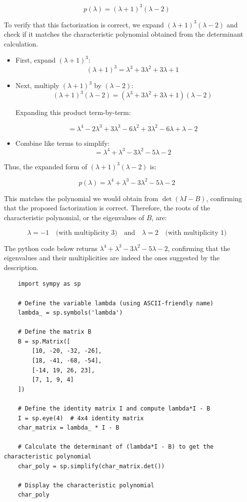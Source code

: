 \documentclass{article}
\begin{document}
\[
    p(\lambda) = (\lambda + 1)^3 (\lambda - 2)
\]

To verify that this factorization is correct, we expand \( (\lambda + 1)^3 (\lambda - 2) \) and check if it matches the characteristic polynomial obtained from the determinant calculation.

\begin{itemize}
    \item First, expand \( (\lambda + 1)^3 \):
          \[
              (\lambda + 1)^3 = \lambda^3 + 3\lambda^2 + 3\lambda + 1
          \]

    \item Next, multiply \( (\lambda + 1)^3 \) by \( (\lambda - 2) \):
          \[
              (\lambda + 1)^3 (\lambda - 2) = (\lambda^3 + 3\lambda^2 + 3\lambda + 1)(\lambda - 2)
          \]

          Expanding this product term-by-term:

          \[
              = \lambda^4 - 2\lambda^3 + 3\lambda^3 - 6\lambda^2 + 3\lambda^2 - 6\lambda + \lambda - 2
          \]

    \item Combine like terms to simplify:
          \[
              = \lambda^4 + \lambda^3 - 3\lambda^2 - 5\lambda - 2
          \]
\end{itemize}

Thus, the expanded form of \( (\lambda + 1)^3 (\lambda - 2) \) is:

\[
    p(\lambda) = \lambda^4 + \lambda^3 - 3\lambda^2 - 5\lambda - 2
\]

This matches the polynomial we would obtain from \( \det(\lambda I - B) \), confirming that the proposed factorization is correct. Therefore, the roots of the characteristic polynomial, or the eigenvalues of \( B \), are:

\[
    \lambda = -1 \quad \text{(with multiplicity 3)} \quad \text{and} \quad \lambda = 2 \quad \text{(with multiplicity 1)}
\]

The python code below returns $\displaystyle \lambda^{4} + \lambda^{3} - 3 \lambda^{2} - 5 \lambda - 2$,
confirming that the eigenvalues and their multiplicities are indeed the ones suggested by the description.
\begin{lstlisting}
    import sympy as sp

    # Define the variable lambda (using ASCII-friendly name)
    lambda_ = sp.symbols('lambda')

    # Define the matrix B
    B = sp.Matrix([
        [10, -20, -32, -26],
        [18, -41, -68, -54],
        [-14, 19, 26, 23],
        [7, 1, 9, 4]
    ])

    # Define the identity matrix I and compute lambda*I - B
    I = sp.eye(4)  # 4x4 identity matrix
    char_matrix = lambda_ * I - B

    # Calculate the determinant of (lambda*I - B) to get the characteristic polynomial
    char_poly = sp.simplify(char_matrix.det())

    # Display the characteristic polynomial
    char_poly
    \end{lstlisting}
\end{document}
